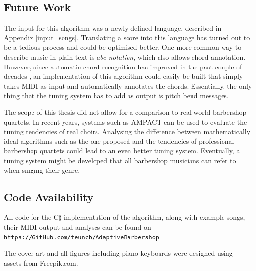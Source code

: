 \documentclass[a4paper]{article}
\begin{document}
\subsection{Future Work}
The input for this algorithm was a newly-defined language, described in Appendix \ref{input_songs}. Translating a score into this language has turned out to be a tedious process and could be optimised better. One more common way to describe music in plain text is \textit{abc notation}, which also allows chord annotation. \cite{walshaw_abc2mtex_1997} However, since automatic chord recognition has improved in the past couple of decades \cite{burgoyne_cross-validated_2007}, an implementation of this algorithm could easily be built that simply takes MIDI as input and automatically annotates the chords. Essentially, the only thing that the tuning system has to add as output is pitch bend messages.

The scope of this thesis did not allow for a comparison to real-world barbershop quartets. In recent years, systems such as AMPACT can be used to evaluate the tuning tendencies of real choirs. \cite{devaney_study_2012, chandna_deep-learning_2022} Analysing the difference between mathematically ideal algorithms such as the one proposed and the tendencies of professional barbershop quartets could lead to an even better tuning system. Eventually, a tuning system might be developed that all barbershop musicians can refer to when singing their genre.

\subsection{Code Availability}
All code for the C$\sharp$ implementation of the algorithm, along with example songs, their MIDI output and analyses can be found on \texttt{\url{https://GitHub.com/teuncb/AdaptiveBarbershop}}.

% 
% 
\printbibliography
\noindent The cover art and all figures including piano keyboards were designed using assets from Freepik.com.
\end{document}
